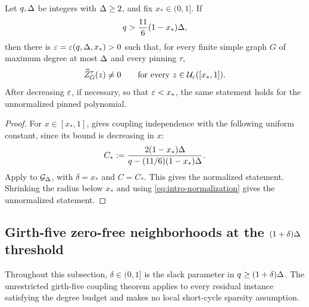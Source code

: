 \begin{corollary}
\label{cor:intro-high-temperature}
Let \(q,\Delta\) be integers with \(\Delta\ge2\), and fix \(x_*\in(0,1]\).  If
\[
  q>\frac{11}{6}(1-x_*)\Delta,
\]
then there is \(\varepsilon=\varepsilon(q,\Delta,x_*)>0\) such that, for every finite
simple graph \(G\) of maximum degree at most \(\Delta\) and every pinning
\(\tau\),
\[
  \widehat Z_{G}^{\tau}(z)\ne0
  \qquad\text{for every }z\in\mathcal U_\varepsilon([x_*,1]).
\]
After decreasing \(\varepsilon\), if necessary, so that \(\varepsilon<x_*\), the same
statement holds for the unnormalized pinned polynomial.
\end{corollary}

\begin{proof}
For \(x\in[x_*,1]\),  gives coupling
independence with the following uniform constant, since its bound is
decreasing in \(x\):
\[
  C_*:=
  \frac{2(1-x_*)\Delta}
       {q-(11/6)(1-x_*)\Delta}.
\]
Apply  to \(\mathcal{G}_{\Delta}\), with
\(\delta=x_*\) and \(C=C_*\).  This gives the normalized statement.
Shrinking the radius below \(x_*\) and using
\eqref{eq:intro-normalization} gives the unnormalized statement.
\end{proof}

\subsection{Girth-five zero-free neighborhoods at the \texorpdfstring{$(1+\delta)\Delta$}{(1+delta)Delta} threshold}
\label{app:girth5-zero-free}

Throughout this subsection, $\delta\in(0,1]$ is the slack parameter in
$q\ge(1+\delta)\Delta$.  The unrestricted girth-five coupling theorem
 applies to every residual instance satisfying the degree budget and makes
no local short-cycle sparsity assumption.

